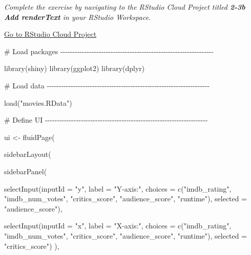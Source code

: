 \documentclass[
  letterpaper,
  DIV=11,
  numbers=noendperiod]{scrreprt}
\newenvironment{Shaded}{\begin{snugshade}}{\end{snugshade}}
\newcommand{\AttributeTok}[1]{\textcolor[rgb]{0.40,0.46,0.14}{#1}}
\newcommand{\CommentTok}[1]{\textcolor[rgb]{0.37,0.37,0.37}{#1}}
\newcommand{\FunctionTok}[1]{\textcolor[rgb]{0.28,0.35,0.67}{#1}}
\newcommand{\NormalTok}[1]{\textcolor[rgb]{0.00,0.46,0.62}{#1}}
\newcommand{\OtherTok}[1]{\textcolor[rgb]{0.00,0.46,0.62}{#1}}
\newcommand{\StringTok}[1]{\textcolor[rgb]{0.13,0.47,0.30}{#1}}
\begin{document}
\emph{Complete the exercise by navigating to the RStudio Cloud Project
titled \textbf{2-3b Add renderText} in your RStudio Workspace}.

\href{https://rstudio.cloud/spaces/81721/join?access_code=I4VJaNsKfTqR3Td9hLP7E1nz8\%2FtMg6Xbw9Bgqumv}{
Go to RStudio Cloud Project}

\begin{Shaded}
\begin{Highlighting}[]
\CommentTok{\# Load packages {-}{-}{-}{-}{-}{-}{-}{-}{-}{-}{-}{-}{-}{-}{-}{-}{-}{-}{-}{-}{-}{-}{-}{-}{-}{-}{-}{-}{-}{-}{-}{-}{-}{-}{-}{-}{-}{-}{-}{-}{-}{-}{-}{-}{-}{-}{-}{-}{-}{-}{-}{-}{-}{-}{-}{-}{-}{-}{-}{-}{-}{-}{-}{-}}

\FunctionTok{library}\NormalTok{(shiny)}
\FunctionTok{library}\NormalTok{(ggplot2)}
\FunctionTok{library}\NormalTok{(dplyr)}

\CommentTok{\# Load data {-}{-}{-}{-}{-}{-}{-}{-}{-}{-}{-}{-}{-}{-}{-}{-}{-}{-}{-}{-}{-}{-}{-}{-}{-}{-}{-}{-}{-}{-}{-}{-}{-}{-}{-}{-}{-}{-}{-}{-}{-}{-}{-}{-}{-}{-}{-}{-}{-}{-}{-}{-}{-}{-}{-}{-}{-}{-}{-}{-}{-}{-}{-}{-}{-}{-}{-}{-}}

\FunctionTok{load}\NormalTok{(}\StringTok{"movies.RData"}\NormalTok{)}

\CommentTok{\# Define UI {-}{-}{-}{-}{-}{-}{-}{-}{-}{-}{-}{-}{-}{-}{-}{-}{-}{-}{-}{-}{-}{-}{-}{-}{-}{-}{-}{-}{-}{-}{-}{-}{-}{-}{-}{-}{-}{-}{-}{-}{-}{-}{-}{-}{-}{-}{-}{-}{-}{-}{-}{-}{-}{-}{-}{-}{-}{-}{-}{-}{-}{-}{-}{-}{-}{-}{-}{-}}

\NormalTok{ui }\OtherTok{\textless{}{-}} \FunctionTok{fluidPage}\NormalTok{(}

  \FunctionTok{sidebarLayout}\NormalTok{(}
    
    \FunctionTok{sidebarPanel}\NormalTok{(}
      
      \FunctionTok{selectInput}\NormalTok{(}\AttributeTok{inputId =} \StringTok{"y"}\NormalTok{, }
                  \AttributeTok{label =} \StringTok{"Y{-}axis:"}\NormalTok{,}
                  \AttributeTok{choices =} \FunctionTok{c}\NormalTok{(}\StringTok{"imdb\_rating"}\NormalTok{, }\StringTok{"imdb\_num\_votes"}\NormalTok{, }\StringTok{"critics\_score"}\NormalTok{, }\StringTok{"audience\_score"}\NormalTok{, }\StringTok{"runtime"}\NormalTok{), }
                  \AttributeTok{selected =} \StringTok{"audience\_score"}\NormalTok{),}
      
      \FunctionTok{selectInput}\NormalTok{(}\AttributeTok{inputId =} \StringTok{"x"}\NormalTok{, }
                  \AttributeTok{label =} \StringTok{"X{-}axis:"}\NormalTok{,}
                  \AttributeTok{choices =} \FunctionTok{c}\NormalTok{(}\StringTok{"imdb\_rating"}\NormalTok{, }\StringTok{"imdb\_num\_votes"}\NormalTok{, }\StringTok{"critics\_score"}\NormalTok{, }\StringTok{"audience\_score"}\NormalTok{, }\StringTok{"runtime"}\NormalTok{), }
                  \AttributeTok{selected =} \StringTok{"critics\_score"}\NormalTok{)}
\NormalTok{    ),}
    

\end{Highlighting}
\end{Shaded}
\end{document}

